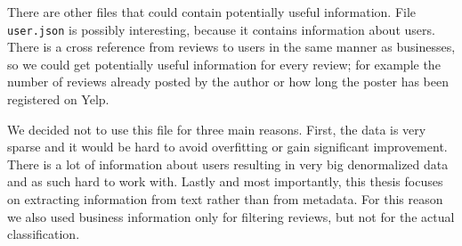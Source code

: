 There are other files that could contain potentially useful information.
File \texttt{user.json} is possibly interesting, because it contains information about users.
There is a cross reference from reviews to users in the same manner as businesses,
so we could get potentially useful information for every review;
for example the number of reviews already posted by the author or
how long the poster has been registered on Yelp.

We decided not to use this file for three main reasons.
First, the data is very sparse and it would be hard to avoid overfitting or gain significant improvement.
There is a lot of information about users resulting in very big denormalized data
and as such hard to work with.
Lastly and most importantly, this thesis focuses on extracting information from text rather than from metadata.
For this reason we also used business information only for filtering reviews,
but not for the actual classification.


